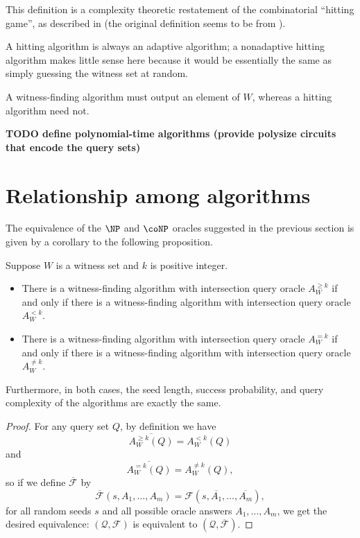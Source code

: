 \documentclass{article}
\newcommand{\todo}[1]{\textbf{TODO #1}}
\newcommand{\mc}{\mathcal}
\begin{document}
This definition is a complexity theoretic restatement of the combinatorial ``hitting game'', as described in \autocite[Section~3]{newport14} (the original definition seems to be from \autocite[Definition~5]{bgi92}).

A hitting algorithm is always an adaptive algorithm; a nonadaptive hitting algorithm makes little sense here because it would be essentially the same as simply guessing the witness set at random.

A witness-finding algorithm must output an element of $W$, whereas a hitting algorithm need not.

\todo{define polynomial-time algorithms (provide polysize circuits that encode the query sets)}

\section{Relationship among algorithms}

The equivalence of the $\NP$ and $\coNP$ oracles suggested in the previous section is given by a corollary to the following proposition.

\begin{proposition}\label{prop:flip}
  Suppose $W$ is a witness set and $k$ is positive integer.
  \begin{itemize}
  \item There is a witness-finding algorithm with intersection query oracle $A^{\geq k}_W$ if and only if there is a witness-finding algorithm with intersection query oracle $A^{< k}_W$.
  \item There is a witness-finding algorithm with intersection query oracle $A^{= k}_W$ if and only if there is a witness-finding algorithm with intersection query oracle $A^{\neq k}_W$.
  \end{itemize}
  Furthermore, in both cases, the seed length, success probability, and query complexity of the algorithms are exactly the same.
\end{proposition}
\begin{proof}
  For any query set $Q$, by definition we have
  \begin{equation*}
    \overline{A^{\geq k}_W(Q)} = A^{< k}_W(Q)
  \end{equation*}
  and
  \begin{equation*}
    \overline{A^{= k}_W(Q)} = A^{\neq k}_W(Q),
  \end{equation*}
  so if we define $\overline{\mc{F}}$ by
  \begin{equation*}
    \overline{\mc{F}}(s, A_1, \dotsc, A_m) = \mc{F}(s, \overline{A_1}, \dotsc, \overline{A_m}),
  \end{equation*}
  for all random seeds $s$ and all possible oracle answers $A_1, \dotsc, A_m$, we get the desired equivalence: $(\mc{Q}, \mc{F})$ is equivalent to $(\mc{Q}, \overline{\mc{F}})$.
\end{proof}
\end{document}
